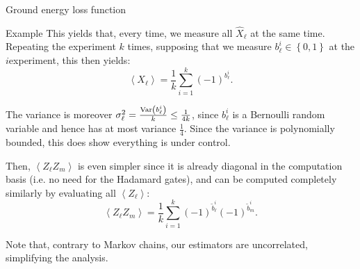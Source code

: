\documentclass[a4paper]{article}
\begin{document}
\begin{parag}{Ground energy loss function}
\begin{subparag}{Example}
        This yields that, every time, we measure all $\hat{X}_{\ell}$ at the same time. Repeating the experiment $k$ times, supposing that we measure $b_{\ell}^i \in \left\{0, 1\right\}$ at the $i$\Th experiment, this then yields: 
        \[\left\langle X_{\ell} \right\rangle = \frac{1}{k} \sum_{i=1}^{k} \left(-1\right)^{b_{\ell}^i}.\]

        The variance is moreover $\sigma_{\ell}^2 = \frac{\Var\left(b_{\ell}^i\right)}{k} \leq \frac{1}{4k}$, since $b_{\ell}^i$ is a Bernoulli random variable and hence has at most variance $\frac{1}{4}$. Since the variance is polynomially bounded, this does show everything is under control.

        Then, $\left\langle Z_{\ell} Z_m \right\rangle$ is even simpler since it is already diagonal in the computation basis (i.e. no need for the Hadamard gates), and can be computed completely similarly by evaluating all $\left\langle Z_{\ell} \right\rangle$:
        \[\left\langle Z_{\ell} Z_m \right\rangle = \frac{1}{k} \sum_{i=1}^{k} \left(-1\right)^{\widetilde{b}_{\ell}^i} \left(-1\right)^{\widetilde{b}_m^i}.\]
        
        Note that, contrary to Markov chains, our estimators are uncorrelated, simplifying the analysis.
    \end{subparag}
\end{parag}
\end{document}
